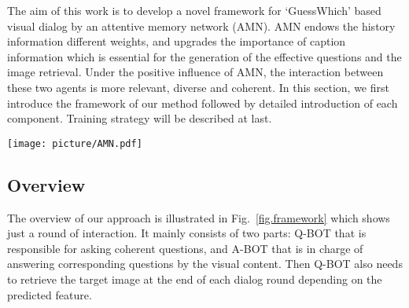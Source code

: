 \documentclass[review]{elsarticle}
\begin{document}
	The aim of this work is to develop a novel framework for `GuessWhich' based visual dialog by an attentive memory network (AMN). AMN endows the history information different weights, and upgrades the importance of caption information which is essential for the generation of the effective questions and the image retrieval. 
	Under the positive influence of AMN, the interaction between these two agents is more relevant, diverse and coherent.
	In this section, we first introduce the framework of our method followed by detailed introduction of each component. Training strategy will be described at last. 
\begin{figure*}[ht]
	\centering
	\centering
	\texttt{[image: picture/AMN.pdf]}
	\centering 
	\caption{General framework of the proposed method. It illustrates the architecture of the two agents and the interaction between them at round t. Firstly, a question $\mathbf{q_{t}}$ is generated from question decoder based on the state encoding $\mathbf{s^{Q}_{t-1}}$. Secondly, A-BOT receives the question and encodes it. The encoded question queries the memory $\mathbf{M^{A}_{t-1}}$, and then the fusion model in the AMN$^A$ outputs the contacted information ($\mathbf{f^{Q}_{t}}$, $\textbf{C}$, $\mathbf{h^{Q}_{t-1}}$) which is used to decode an answer $\mathbf{a_{t}}$. Thirdly, A-BOT delivers the answer $\mathbf{a_{t}}$ to Q-BOT. And the question-answer pair is embedded as a fact $\mathbf{f_{t}}$ which queries the memory $\mathbf{M^{Q}_{t-1}}$. Then the fusion model in AMN$^Q$ outputs the contacted information ($\mathbf{q_{t}}$, $\textbf{I}$, $\mathbf{h^{A}_{t-1}}$) which is used to update the state $\mathbf{s^{Q}_{t}}$. Finally, Q-BOT predicts an image representation $\mathbf{\hat{y}_{t}}$ depending on the state $\mathbf{s^{Q}_{t}}$, and receives a reward.} 
	\label{fig.framework}
\end{figure*}	

\subsection{Overview}
	The overview of our approach is illustrated in Fig.~\ref{fig.framework} which shows just a round of interaction.
	It mainly consists of two parts: Q-BOT that is responsible for asking coherent questions, and A-BOT that is in charge of answering corresponding questions by the visual content. 
	Then Q-BOT also needs to retrieve the target image at the end of each dialog round depending on the predicted feature.
	
\end{document}
